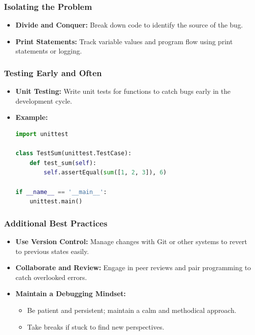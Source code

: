 \documentclass{beamer}
\begin{document}
\begin{frame}[fragile]
    \frametitle{Isolating the Problem}
    \begin{itemize}
        \item \textbf{Divide and Conquer:} Break down code to identify the source of the bug.
        \item \textbf{Print Statements:} Track variable values and program flow using print statements or logging.
    \end{itemize}
\end{frame}

\begin{frame}[fragile]
    \frametitle{Testing Early and Often}
    \begin{itemize}
        \item \textbf{Unit Testing:} Write unit tests for functions to catch bugs early in the development cycle.
        \item \textbf{Example:}
        \begin{lstlisting}[language=Python]
import unittest

class TestSum(unittest.TestCase):
    def test_sum(self):
        self.assertEqual(sum([1, 2, 3]), 6)

if __name__ == '__main__':
    unittest.main()
        \end{lstlisting}
    \end{itemize}
\end{frame}

\begin{frame}
    \frametitle{Additional Best Practices}
    \begin{itemize}
        \item \textbf{Use Version Control:} Manage changes with Git or other systems to revert to previous states easily.
        \item \textbf{Collaborate and Review:} Engage in peer reviews and pair programming to catch overlooked errors.
        \item \textbf{Maintain a Debugging Mindset:} 
            \begin{itemize}
                \item Be patient and persistent; maintain a calm and methodical approach.
                \item Take breaks if stuck to find new perspectives.
            \end{itemize}
    \end{itemize}
\end{frame}
\end{document}
